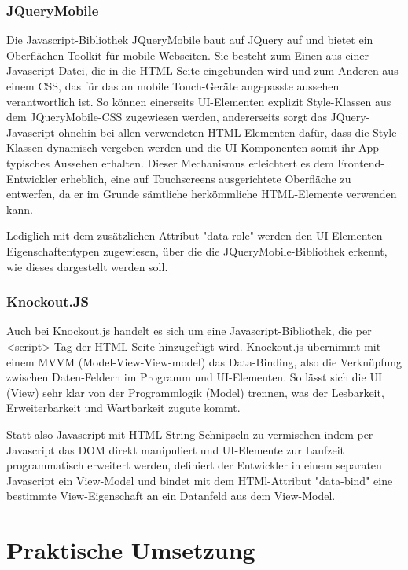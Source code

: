 \documentclass{scrreprt}
\begin{document}
\subsection{JQueryMobile}
Die Javascript-Bibliothek JQueryMobile baut auf JQuery auf und bietet ein Oberflächen-Toolkit für mobile Webseiten. Sie besteht zum Einen aus einer Javascript-Datei, die in die HTML-Seite eingebunden wird und zum Anderen aus einem CSS, das für das an mobile Touch-Geräte angepasste aussehen verantwortlich ist. 
So können einerseits UI-Elementen explizit Style-Klassen aus dem JQueryMobile-CSS zugewiesen werden, andererseits sorgt das JQuery-Javascript ohnehin bei allen verwendeten HTML-Elementen dafür, dass die Style-Klassen dynamisch vergeben werden und die UI-Komponenten somit ihr App-typisches Aussehen erhalten.
Dieser Mechanismus erleichtert es dem Frontend-Entwickler erheblich, eine auf Touchscreens ausgerichtete Oberfläche zu entwerfen, da er im Grunde sämtliche herkömmliche HTML-Elemente verwenden kann. 

Lediglich mit dem zusätzlichen Attribut "data-role" werden den UI-Elementen Eigenschaftentypen zugewiesen, über die die JQueryMobile-Bibliothek erkennt, wie dieses dargestellt werden soll.


\subsection{Knockout.JS}
Auch bei Knockout.js handelt es sich um eine Javascript-Bibliothek, die per <script>-Tag der HTML-Seite hinzugefügt wird. Knockout.js übernimmt mit einem MVVM (Model-View-View-model) das Data-Binding, also die Verknüpfung zwischen Daten-Feldern im Programm und UI-Elementen.
So lässt sich die UI (View) sehr klar von der Programmlogik (Model) trennen, was der Lesbarkeit, Erweiterbarkeit und Wartbarkeit zugute kommt.

Statt also Javascript mit HTML-String-Schnipseln zu vermischen indem per Javascript das DOM direkt manipuliert und UI-Elemente zur Laufzeit programmatisch erweitert werden, definiert der Entwickler in einem separaten Javascript ein View-Model und bindet mit dem HTMl-Attribut "data-bind" eine bestimmte View-Eigenschaft an ein Datanfeld aus dem View-Model.


\chapter{Praktische Umsetzung}
\end{document}
